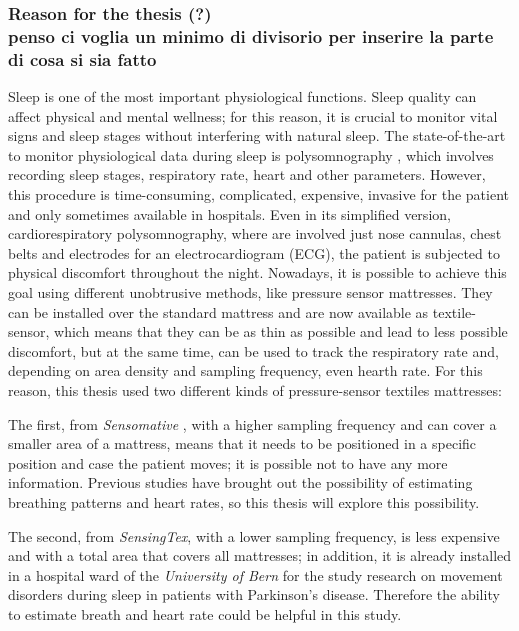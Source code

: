 \documentclass[a4paper,11pt, oneside,italian]{article}
\begin{document}
\subsubsection*{Reason for the thesis (?) \\ penso ci voglia un minimo di divisorio per inserire la parte di cosa si sia fatto}
Sleep is one of the most important physiological functions. Sleep quality can affect physical 
and mental wellness; for this reason, it is crucial to monitor vital signs and sleep stages without interfering with natural sleep. 
The state-of-the-art to monitor physiological data during sleep is polysomnography \cite{Penzel2016ModulationsPolysomnography}, which involves recording sleep stages, respiratory rate, heart and other parameters. However, this procedure is time-consuming, complicated, expensive, invasive for the patient and only sometimes available in hospitals. Even in its simplified version, cardiorespiratory polysomnography, where are involved just nose cannulas, chest belts and electrodes for an electrocardiogram (ECG), the patient is subjected to physical discomfort throughout the night.
Nowadays, it is possible to achieve this goal using different unobtrusive methods, like pressure sensor mattresses.
They can be installed over the standard mattress and are now available as textile-sensor, which means that they can be as thin as possible and lead to less possible discomfort, but at the same time, can be used to track the respiratory rate and, depending on area density and sampling frequency, even hearth rate. For this reason, this thesis used two different kinds of pressure-sensor textiles mattresses:

The first, from \textit{Sensomative} \cite{sensomative}, with a higher sampling frequency and can cover a smaller area of a mattress, means that it needs to be positioned in a specific position and case the patient moves; it is possible not to have any more information. Previous studies have brought out the possibility of estimating breathing patterns and heart rates, so this thesis will explore this possibility.

The second, from \textit{SensingTex}\cite{sentex}, with a lower sampling frequency, is less expensive and with a total area that covers all mattresses; in addition, it is already installed in a hospital ward of the \textit{University of Bern} for the study research on movement disorders during sleep in patients with Parkinson’s disease. Therefore the ability to estimate breath and heart rate could be helpful in this study.
\end{document}
